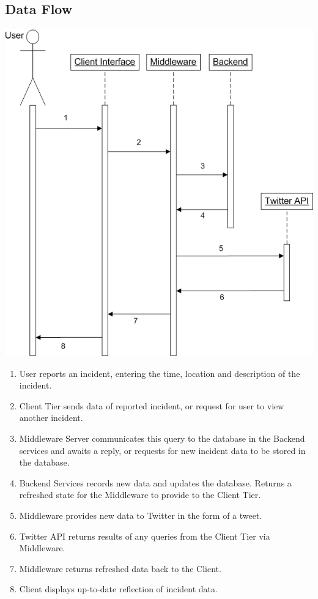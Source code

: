 \documentclass{sig-alt-release2}
\begin{document}
\subsection{Data Flow}

\includegraphics[scale=0.3]{img/3.png}

\begin{enumerate}
\item    User reports an incident, entering the time, location and description of the incident.
\item    Client Tier sends data of reported incident, or request for user to view another incident.
\item    Middleware Server communicates this query to the database in the Backend services and awaits a reply, or requests for new incident data to be stored in the database.
\item    Backend Services records new data and updates the database. Returns a refreshed state for the Middleware to provide to the Client Tier.
\item    Middleware provides new data to Twitter in the form of a tweet.
\item    Twitter API returns results of any queries from the Client Tier via Middleware.
\item    Middleware returns refreshed data back to the Client.
\item    Client displays up-to-date reflection of incident data.
\end{enumerate}
\end{document}
